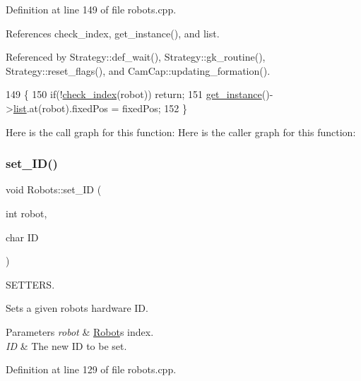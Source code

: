 Definition at line 149 of file robots.\+cpp.



References check\+\_\+index, get\+\_\+instance(), and list.



Referenced by Strategy\+::def\+\_\+wait(), Strategy\+::gk\+\_\+routine(), Strategy\+::reset\+\_\+flags(), and Cam\+Cap\+::updating\+\_\+formation().


\begin{DoxyCode}
149                                                   \{
150     \textcolor{keywordflow}{if}(!\hyperlink{robots_8hpp_ae3e6ae8f87cdc750c0b99bc609d9ae43}{check\_index}(robot)) \textcolor{keywordflow}{return};
151     \hyperlink{class_robots_a589bce74db5f34af384952d48435168f}{get\_instance}()->\hyperlink{class_robots_a2c6b77265028f82a4342ca1ef15ed305}{list}.at(robot).fixedPos = fixedPos;
152 \}
\end{DoxyCode}
Here is the call graph for this function\+:
Here is the caller graph for this function\+:
\mbox{\label{class_robots_aea3f1278d0503cd81adc9ceea0a7d1df}} 
\subsubsection{\texorpdfstring{set\+\_\+\+I\+D()}{set\_ID()}}
{\footnotesize\ttfamily void Robots\+::set\+\_\+\+ID (\begin{DoxyParamCaption}\item[{int}]{robot,  }\item[{char}]{ID }\end{DoxyParamCaption})\hspace{0.3cm}{\ttfamily [static]}}



S\+E\+T\+T\+E\+RS. 

Sets a given robot\textquotesingle{}s hardware ID. 
\begin{DoxyParams}{Parameters}
{\em robot} & \hyperlink{struct_robots_1_1_robot}{Robot}\textquotesingle{}s index. \\
\hline
{\em ID} & The new ID to be set. \\
\hline
\end{DoxyParams}


Definition at line 129 of file robots.\+cpp.



